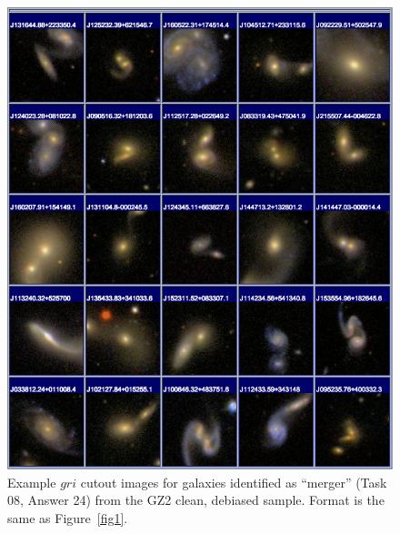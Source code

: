\documentclass[useAMS,usenatbib]{mn2e}
\begin{document}
\newpage
\clearpage
\begin{figure}
\includegraphics[angle=0,width=7.0in]{figures/gallery/merger.png}
\caption{Example $gri$ cutout images for galaxies identified as ``merger'' (Task 08, Answer 24) from the GZ2 clean, debiased sample. Format is the same as Figure~\ref{fig1}.}
\end{figure}
\end{document}
